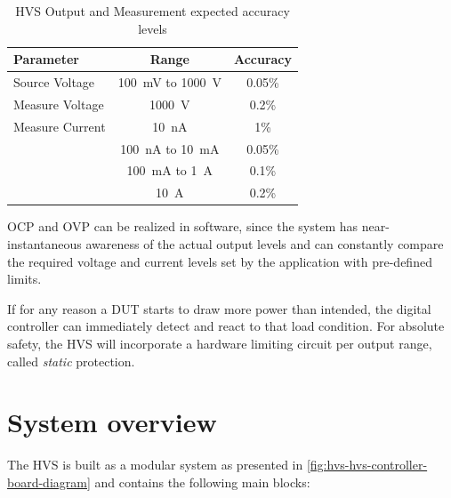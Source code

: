 \begin{table}[h!] %
    \centering
    \begin{tabular}{l|c|c}
        \toprule
        \textbf{Parameter} & \textbf{Range}                            & \textbf{Accuracy} \\
        \midrule
        \midrule
        Source Voltage     & \SI{100}{\milli\volt} to \SI{1000}{\volt} & 0.05\%            \\

        Measure Voltage    & \SI{1000}{\volt}                          & 0.2\%             \\
        \midrule
        Measure Current    & \SI{10}{\nano\ampere}                     & 1\%               \\

        \text{  } & \SI{100}{\nano\ampere} to \SI{10}{\milli\ampere}
        & 0.05\% \\

        \text{  } & \SI{100}{\milli\ampere} to \SI{1}{\ampere}
        & 0.1\% \\

        \text{  }            & \SI{10}{\ampere}                          & 0.2\%

    \end{tabular}
    \caption{\acs{HVS} Output and Measurement expected accuracy levels}
    \label{tab:hvs-measurement-nominal-accuracy}
\end{table}

\ac{OCP} and \ac{OVP} can be realized in software, since the system has
near-instantaneous awareness of the actual output levels and can constantly compare
the required voltage and current levels set by the application with
pre-defined limits.

If for any reason a \ac{DUT} starts to draw more power than intended,
the digital controller can immediately detect and react to that load condition.
For absolute safety, the \ac{HVS} will incorporate a hardware
limiting circuit per output range, called \emph{static}
protection.


\section{System overview}
\label{sec:system-overview}

The \ac{HVS} is built as a modular system as presented in
\autoref{fig:hvs-hvs-controller-board-diagram} and contains the following
main blocks:

